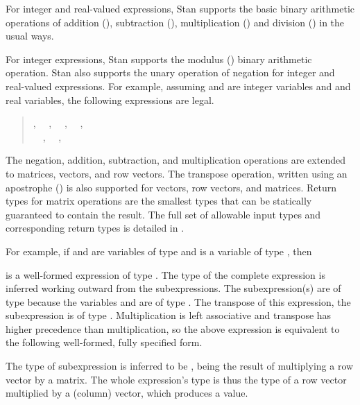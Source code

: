 For integer and real-valued expressions, Stan supports the basic
binary arithmetic operations of addition (\code{+}), subtraction
(\code{-}), multiplication (\code{*}) and division (\code{/}) in the
usual ways.

For integer expressions, Stan supports the modulus (\code{\%}) binary
arithmetic operation.  Stan also supports the unary operation of
negation for integer and real-valued expressions.  For example,
assuming  and  are integer variables and  and
 real variables, the following expressions are legal.
%
\begin{quote}
,
\ \ ,
\ \ ,
\ \ ,
\\
\ \ ,
\ \ ,
\ \ 
\end{quote}
%
The negation, addition, subtraction, and multiplication operations are
extended to matrices, vectors, and row vectors.  The transpose
operation, written using an apostrophe () is also supported
for vectors, row vectors, and matrices.  Return types for matrix
operations are the smallest types that can be statically guaranteed to
contain the result.  The full set of allowable input types and
corresponding return types is detailed in
.

For example, if  and  are variables of type
 and  is a variable of type ,
then
%
\begin{quote}
\end{quote}
%
is a well-formed expression of type .  The type of the
complete expression is inferred working outward from the
subexpressions.  The subexpression(s)  are of type
 because the variables  and  are of type
.  The transpose of this expression, the subexpression
 is of type .  Multiplication is
left associative and transpose has higher precedence than
multiplication, so the above expression is equivalent to the following
well-formed, fully specified form.
%
\begin{quote}
\end{quote}
%
The type of subexpression  is inferred to be
, being the result of multiplying a row vector by a
matrix.  The whole expression's type is thus the type of a row vector
multiplied by a (column) vector, which produces a  value.

